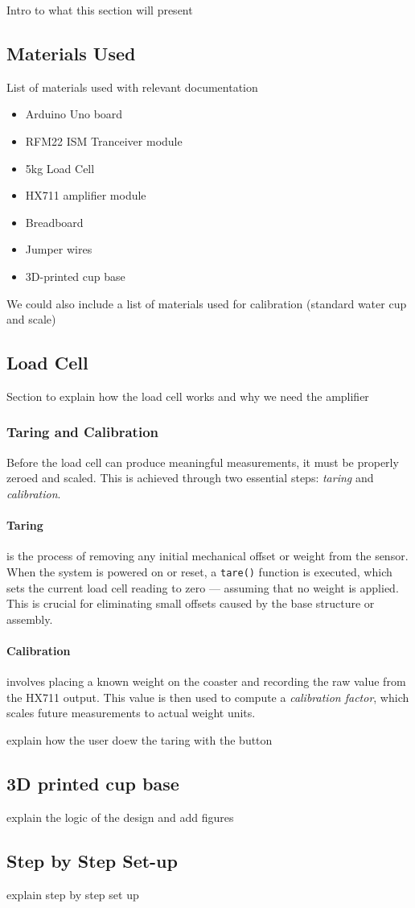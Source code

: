 Intro to what this section will present

\subsection{Materials Used}
List of materials used with relevant documentation

\begin{itemize}
  \item Arduino Uno board
  \item RFM22 ISM Tranceiver module
  \item 5kg Load Cell
  \item HX711 amplifier module
  \item Breadboard
  \item Jumper wires
  \item 3D-printed cup base
\end{itemize}

We could also include a list of materials used for calibration (standard water cup and scale)

\subsection{Load Cell}
Section to explain how the load cell works and why we need the amplifier%

\subsubsection{Taring and Calibration}
Before the load cell can produce meaningful measurements, it must be properly zeroed and scaled. This is achieved through two essential steps: \textit{taring} and \textit{calibration}.

\paragraph{Taring} is the process of removing any initial mechanical offset or weight from the sensor. When the system is powered on or reset, a \texttt{tare()} function is executed, which sets the current load cell reading to zero — assuming that no weight is applied. This is crucial for eliminating small offsets caused by the base structure or assembly.

\paragraph{Calibration} involves placing a known weight on the coaster and recording the raw value from the HX711 output. This value is then used to compute a \textit{calibration factor}, which scales future measurements to actual weight units.


explain how the user doew the taring with the button


\subsection{3D printed cup base}
explain the logic of the design and add figures

\subsection{Step by Step Set-up}
explain step by step set up 